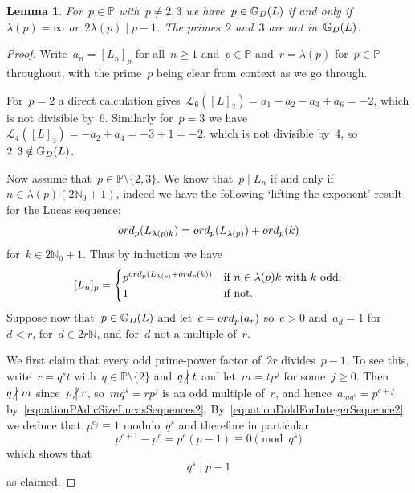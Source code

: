 \documentclass[10pt,a4paper]{amsart}
\numberwithin{equation}{section} %
\newtheorem{lemma}[thm]{Lemma}
\numberwithin{table}{section} %
\numberwithin{figure}{section}
\def\NN{\mathbb{N}}
\def\PP{\mathbb{P}}
\def\gooddoldprimes{\mathbb{G}_{\rm{D}}}
\newcommand\ord{{\rm{ord}}}
\newcommand\least{{\mathcal{L}}}
\newcommand\notdivides{\mathrel{\kern-3pt\not\!\kern4.3pt\bigm|}}
\newcommand\divides\mid
\def\ge{\geqslant}
\begin{document}
\begin{lemma}\label{lemmaMainLucas}
For~$p\in\PP$ with~$p\neq2,3$ we have~$p\in\gooddoldprimes(L)$ if
and only if~$\lambda(p)=\infty$ or~$2\lambda(p)\divides p-1$.
The primes~$2$ and~$3$ are not in~$\gooddoldprimes(L)$.
\end{lemma}

\begin{proof}
Write~$a_n=[L_n]_p$ for all~$n\ge1$ and~$p\in\mathbb{P}$
and~$r=\lambda(p)$ for~$p\in\mathbb{P}$ throughout,
with the prime~$p$ being clear from context as we go through.

For~$p=2$ a direct calculation gives~$
\least_6([L]_2)=a_1-a_2-a_3+a_6=-2$,
which is not divisible by~$6$.
Similarly for~$p=3$ we have~$\least_4([L]_3)=-a_2+a_4=-3+1=-2$.
which is not divisible by~$4$, so~$2,3\notin\gooddoldprimes(L)$.

Now assume that~$p\in\mathbb{P}\setminus\{2,3\}$.
We know that~$p\divides L_n$ if and only if~$n\in\lambda(p)(2\NN_0+1)$,
indeed we have the following `lifting the exponent' result for
the Lucas sequence:
\begin{equation*}\label{equationPAdicSizeLucasSequences}
\ord_p(L_{\lambda(p)k})
=
\ord_p(L_{\lambda(p)})+\ord_p(k)
\end{equation*}
for~$k\in2\NN_0+1$.
Thus by induction we have
\begin{equation}\label{equationPAdicSizeLucasSequences2}
[L_n]_p
=
\begin{cases}
p^{\ord_p(L_{\lambda(p)}+\ord_p(k))}&\mbox{if }n\in\lambda(p)k\mbox{ with $k$ odd};\\
1&\mbox{if not.}
\end{cases}
\end{equation}
Suppose now that~$p\in\gooddoldprimes(L)$ and
let~$c=\ord_p(a_r)$ so~$c>0$ and~$a_d=1$
for~$d<r$, for~$d\in2r\mathbb{N}$, and for~$d$ not a multiple of~$r$.

We first claim that every odd prime-power factor of~$2r$
divides~$p-1$.
To see this, write~$r=q^st$ with~$q\in\mathbb{P}\setminus\{2\}$
and~$q\notdivides t$ and let~$m=tp^j$ for some~$j\ge0$.
Then~$q\notdivides m$ since~$p\notdivides r$,
so~$mq^s=rp^j$ is an odd multiple of~$r$,
and hence~$a_{mq^s}=p^{c+j}$ by~\eqref{equationPAdicSizeLucasSequences2}.
By~\eqref{equationDoldForIntegerSequence2} we deduce
that~$p^{c_j}\equiv1$ modulo~$q^s$ and therefore in particular
\[
p^{c+1}-p^c=p^c(p-1)\equiv0\pmod{q^s}
\]
which shows that
\begin{equation}\label{equationcleveroldSawian}
q^s\divides p-1
\end{equation}
as claimed.


\end{proof}
\end{document}
